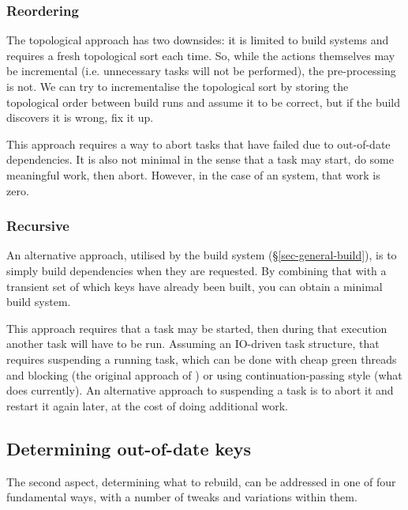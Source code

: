 \vspace{-2mm}
\subsubsection{Reordering}\label{sec-restarting}

The topological approach has two downsides: it is limited to 
build systems and requires a fresh topological sort each time.  So, while the
actions themselves may be incremental (i.e. unnecessary tasks will not be performed),
the pre-processing is not. We can try to incrementalise the topological sort by
storing the topological order between build runs and assume it to
be correct, but if the build discovers it is wrong, fix it up.

This approach requires a way to abort tasks that have failed due to out-of-date
dependencies. It is also not minimal in the sense that a task may start, do some
meaningful work, then abort. However, in the case of an  system,
that work is zero.

\vspace{-2mm}
\subsubsection{Recursive}\label{sec-suspending}

An alternative approach, utilised by the  build system
(\S\ref{sec-general-build}), is to simply build dependencies when they are
requested. By combining that with a transient set of which keys have already
been built, you can obtain a minimal build system.

This approach requires that a task may be started, then during that execution
another task will have to be run. Assuming an IO-driven task structure,
that requires suspending a running task, which can be done with cheap
green threads and blocking (the original approach of \Shake) or using
continuation-passing style (what \Shake does currently). An alternative approach to
suspending a task is to abort it and restart it again later, at the cost
of doing additional work.

\subsection{Determining out-of-date keys} \label{sec-out-of-date}

The second aspect, determining what to rebuild, can be addressed in one of four
fundamental ways, with a number of tweaks and variations within them.

